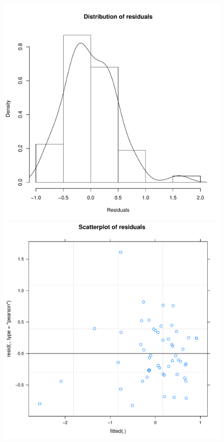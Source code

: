 \begin{figure}[htbp]
    \includegraphics[scale =.4]{images/TEM2TeamHist.pdf}
    \includegraphics[scale =.4]{images/TEM2TeamScatter.pdf}

\end{figure}
